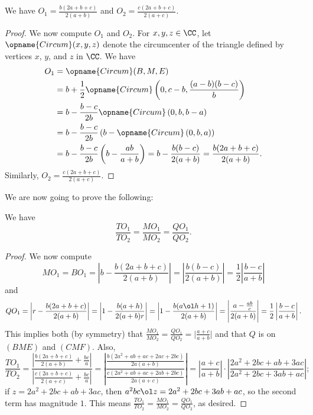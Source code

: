 \begin{claim*}
  We have $O_1 = \frac{b(2a+b+c)}{2(a+b)}$
  and $O_2 = \frac{c(2a+b+c)}{2(a+c)}$.
\end{claim*}
\begin{proof}
  We now compute $O_1$ and $O_2$.
  For $x,y,z\in\CC$, let $\opname{Circum}(x,y,z)$
  denote the circumcenter of the triangle
  defined by vertices $x$, $y$, and $z$ in $\CC$. We have
  \begin{align*}
  O_1&=\opname{Circum}(B,M,E)\\
  &=b+\frac12\opname{Circum}\left(0,c-b,\frac{(a-b)(b-c)}b\right)\\
  &=b-\frac{b-c}{2b}\opname{Circum}\left(0,b,b-a\right)\\
  &=b-\frac{b-c}{2b}\left(b-\opname{Circum}\left(0,b,a\right)\right)\\
  &=b-\frac{b-c}{2b}\left(b-\frac{ab}{a+b}\right)=b-\frac{b(b-c)}{2(a+b)}=\frac{b(2a+b+c)}{2(a+b)}.
  \end{align*}
  Similarly, $O_2=\frac{c(2a+b+c)}{2(a+c)}$.
\end{proof}

We are now going to prove the following:
\begin{claim*}
  We have
  \[\frac{TO_1}{TO_2}=\frac{MO_1}{MO_2}=\frac{QO_1}{QO_2}.\]
\end{claim*}
\begin{proof}
  We now compute
  \[MO_1=BO_1=\left|b-\frac{b(2a+b+c)}{2(a+b)}\right|
    =\left|\frac{b(b-c)}{2(a+b)}\right|=\frac12\left|\frac{b-c}{a+b}\right|\]
  and
  \[QO_1=\left|r-\frac{b(2a+b+c)}{2(a+b)}\right|
    =\left|1-\frac{b(a+h)}{2(a+b)r}\right|=\left|1-\frac{b(a\ol h+1)}{2(a+b)}\right|
    =\left|\frac{a-\frac{ab}c}{2(a+b)}\right|=\frac12\left|\frac{b-c}{a+b}\right|.\]
  This implies both (by symmetry) that
  $\frac{MO_1}{MO_2}=\frac{QO_1}{QO_2}=\big|\frac{a+c}{a+b}\big|$
  and that $Q$ is on $(BME)$ and $(CMF)$.
  Also,
  \[\frac{TO_1}{TO_2}
    =\frac{\left|\frac{b(2a+b+c)}{2(a+b)}+\frac{bc}a\right|}%
    {\left|\frac{c(2a+b+c)}{2(a+c)}+\frac{bc}a\right|}
    =\left|\frac{\frac{b(2a^2+ab+ac+2ac+2bc)}{2a(a+b)}}{\frac{c(2a^2+ab+ac+2ab+2bc)}{2a(a+c)}}\right|
    =\left|\frac{a+c}{a+b}\right|\cdot\left|\frac{2a^2+2bc+ab+3ac}{2a^2+2bc+3ab+ac}\right|;\]
  if $z=2a^2+2bc+ab+3ac$, then $a^2bc\ol z=2a^2+2bc+3ab+ac$, so the second
  term has magnitude $1$.
  This means $\frac{TO_1}{TO_2}=\frac{MO_1}{MO_2}=\frac{QO_1}{QO_2}$, as desired.
\end{proof}

